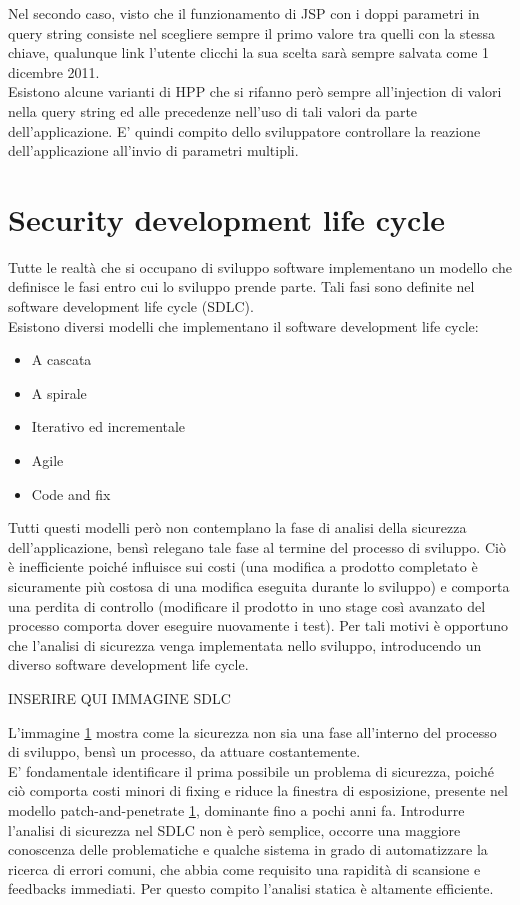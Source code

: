 Nel secondo caso, visto che il funzionamento di JSP con i doppi parametri in query string consiste nel scegliere sempre il primo valore tra quelli con la stessa chiave, qualunque link l'utente clicchi la sua scelta sarà sempre salvata come 1 dicembre 2011.\\
Esistono alcune varianti di HPP che si rifanno però sempre all'injection di valori nella query string ed alle precedenze nell'uso di tali valori da parte dell'applicazione. E' quindi compito dello sviluppatore controllare la reazione dell'applicazione all'invio di parametri multipli.

\section{Security development life cycle}
Tutte le realtà che si occupano di sviluppo software implementano un modello che definisce le fasi entro cui lo sviluppo prende parte. Tali fasi sono definite nel software development life cycle (SDLC).\\
Esistono diversi modelli che implementano il software development life cycle:
\begin{itemize}
\item A cascata
\item A spirale
\item Iterativo ed incrementale
\item Agile
\item Code and fix
\end{itemize}
Tutti questi modelli però non contemplano la fase di analisi della sicurezza dell'applicazione, bensì relegano tale fase al termine del processo di sviluppo. Ciò è inefficiente poiché influisce sui costi (una modifica a prodotto completato è sicuramente più costosa di una modifica eseguita durante lo sviluppo) e comporta una perdita di controllo (modificare il prodotto in uno stage così avanzato del processo comporta dover eseguire nuovamente i test). Per tali motivi è opportuno che l'analisi di sicurezza venga implementata nello sviluppo, introducendo un diverso software development life cycle.

INSERIRE QUI IMMAGINE SDLC

L'immagine \ref{} mostra come la sicurezza non sia una fase all'interno del processo di sviluppo, bensì un processo, da attuare costantemente.\\
E' fondamentale identificare il prima possibile un problema di sicurezza, poiché ciò comporta costi minori di fixing e riduce la finestra di esposizione, presente nel modello patch-and-penetrate  \ref{}, dominante fino a pochi anni fa. 
Introdurre l'analisi di sicurezza nel SDLC non è però semplice, occorre una maggiore conoscenza delle problematiche e qualche sistema in grado di automatizzare la ricerca di errori comuni, che abbia come requisito una rapidità di scansione e feedbacks immediati. Per questo compito l'analisi statica è altamente efficiente.